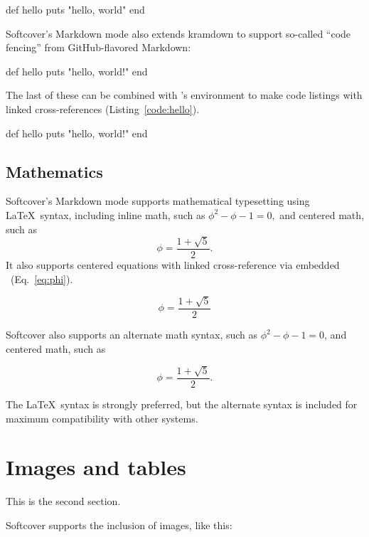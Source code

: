 \begin{code}
def hello
  puts "hello, world"
end
\end{code}

Softcover's Markdown mode also extends kramdown to support so-called ``code fencing'' from GitHub-flavored Markdown:

\begin{code}
def hello
  puts "hello, world!"
end
\end{code}

The last of these can be combined with \PolyTeX's  environment to make code listings with linked cross-references (Listing~\ref{code:hello}).

\begin{codelisting}
\label{code:hello}
\begin{code}
def hello
  puts "hello, world!"
end
\end{code}
\end{codelisting}

\subsection{Mathematics}

Softcover's Markdown mode supports mathematical typesetting using \LaTeX\ syntax, including inline math, such as \( \phi^2 - \phi - 1 = 0, \) and centered math, such as
\[ \phi = \frac{1+\sqrt{5}}{2}. \]
It also supports centered equations with linked cross-reference via embedded \PolyTeX\ (Eq.~\eqref{eq:phi}).

\begin{equation}
\label{eq:phi}
\phi = \frac{1+\sqrt{5}}{2}
\end{equation}

Softcover also supports an alternate math syntax, such as \(\phi^2 - \phi - 1 = 0\), and centered math, such as

\[\phi = \frac{1+\sqrt{5}}{2}.\]

The \LaTeX\ syntax is strongly preferred, but the alternate syntax is included for maximum compatibility with other systems.

\section{Images and tables}

This is the second section.

Softcover supports the inclusion of images, like this:

